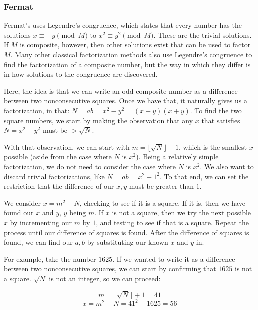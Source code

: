 \documentclass{article}
\begin{document}
\subsubsection*{ Fermat }
\par Fermat's uses Legendre's congruence, which states that every number has the solutions
$x \equiv \pm y \pmod{M}$ to $x^2 \equiv y^2 \pmod{M}$.  These are the trivial solutions. If $M$ is composite,
however, then other solutions exist that can be used to factor $M$. Many other classical factorization methods
also use Legendre's congruence to find the factorization of a composite number, but the way in which they differ
is in how solutions to the congruence are discovered.

\par Here, the idea is that we can write an odd composite number as a difference between two nonconsecutive
squares. Once we have that, it naturally gives us a factorization, in that: $N = ab = x^2 - y^2 = (x-y)(x+y)$.
To find the two square numbers, we start by making the observation that any $x$ that satisfies $N=x^2-y^2$
must be $> \sqrt{N}$.

\par With that observation, we can start with $m=\lfloor \sqrt{N} \rfloor+1$, which is the smallest $x$ possible (aside
from the case where $N$ is $x^2$). Being a relatively simple factorization, we do not need to consider the case
where $N$ is $x^2$. We also want to discard trivial factorizations, like $N = ab = x^2 - 1^2$. To that end, we
can set the restriction that the difference of our $x,y$ must be greater than $1$.

\par We consider $x=m^2-N$, checking to see if it is a square. If it is, then we have found our $x$ and $y$, $y$
being $m$. If $x$ is not a square, then we try the next possible $x$ by incrementing our $m$ by $1$, and testing to see
if that is a square. Repeat the process until our difference of squares is found. After the difference of squares
is found, we can find our $a,b$ by substituting our known $x$ and $y$ in.

\par For example, take the number $1625$. If we wanted to write it as a difference between two nonconsecutive squares,
we can start by confirming that $1625$ is not a square. $\sqrt{N}$ is not an integer, so we can proceed:

    \[m = \lfloor \sqrt{N} \rfloor+1 = 41 \]
    \[x = m^2-N = 41^2 - 1625 = 56 \]
\end{document}
